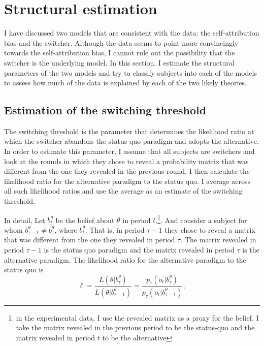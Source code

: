 \documentclass[
  12pt,
]{article}
\begin{document}
\hypertarget{structural-estimation}{%
\section{Structural estimation}\label{structural-estimation}}

I have discussed two models that are consistent with the data: the
self-attribution bias and the switcher. Although the data seems to point
more convincingly towards the self-attribution bias, I cannot rule out
the possibility that the switcher is the underlying model. In this
section, I estimate the structural parameters of the two models and try
to classify subjects into each of the models to assess how much of the
data is explained by each of the two likely theories.

\hypertarget{estimation-of-the-switching-threshold}{%
\subsection{Estimation of the switching
threshold}\label{estimation-of-the-switching-threshold}}

The switching threshold is the parameter that determines the likelihood
ratio at which the switcher abandons the status quo paradigm and adopts
the alternative. In order to estimate this parameter, I assume that all
subjects are switchers and look at the rounds in which they chose to
reveal a probability matrix that was different from the one they
revealed in the previous round. I then calculate the likelihood ratio
for the alternative paradigm to the status quo. I average across all
such likelihood ratios and use the average as an estimate of the
switching threshold.

In detail, Let \(b_{t}^\theta\) be the belief about \(\theta\) in period
\(t\).\footnote{in the experimental data, 
I use the revealed matrix as a proxy for the belief. I take the matrix revealed in the previous period 
to be the status-quo and the matrix revealed in period $t$ to be the alternative}.
And consider a subject for whom
\(b_{\tau-1}^\theta \neq b_{\tau}^\theta\), where \(b_{t}^\theta\). That
is, in period \(\tau-1\) they chose to reveal a matrix that was
different from the one they revealed in period \(\tau\). The matrix
revealed in period \(\tau-1\) is the status quo paradigm and the matrix
revealed in period \(\tau\) is the alternative paradigm. The likelihood
ratio for the alternative paradigm to the status quo is \[
\ell = \frac{L(\theta | b_{\tau}^\theta)}{L(\theta | b_{\tau-1}^\theta)}=\frac{p_\tau(o_t|b_{\tau}^\theta)}{p_{\tau}(o_t|b_{\tau-1}^\theta)},
\]
\end{document}
